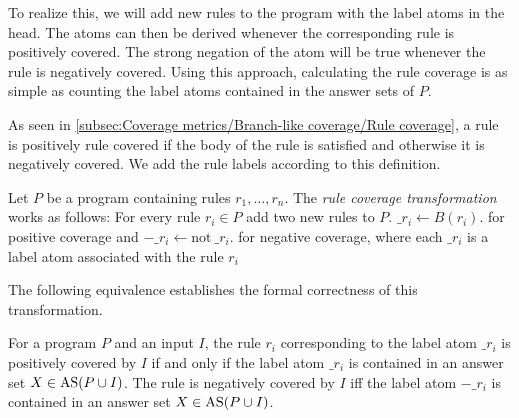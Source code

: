 To realize this, we will add new rules to the program with the label atoms in the head. The atoms can then be derived whenever the corresponding rule is positively covered. The strong negation of the atom will be true whenever the rule is negatively covered. Using this approach, calculating the rule coverage is as simple as counting the label atoms contained in the answer sets of $P$.

As seen in \cref{subsec:Coverage metrics/Branch-like coverage/Rule coverage}, a rule is positively rule covered if the body of the rule is satisfied and otherwise it is negatively covered. We add the rule labels according to this definition.

\begin{definition}
\label{def:rule transformation}
    Let $P$ be a program containing rules \(r_1, \ldots, r_n\). The \emph{rule coverage transformation} works as follows: For every rule \(r_i \in P\) add two new rules to $P$. \(\_r_i \leftarrow B(r_i).\) for positive coverage and \(-\_r_i \leftarrow \text{not}\ \_r_i.\) for negative coverage, where each $\_r_i$ is a label atom associated with the rule $r_i$
\end{definition}

The following equivalence establishes the formal correctness of this transformation.
\begin{theorem}
\label{th:rule transformation}
    For a program $P$ and an input $I$, the rule $r_i$ corresponding to the label atom $\_r_i$ is positively covered by $I$ if and only if the label atom $\_r_i$ is contained in an answer set \(X \in \operatorname{AS}(P \cup I)\). The rule is negatively covered by $I$ iff the label atom $-\_r_i$ is contained in an answer set \(X \in \operatorname{AS}(P \cup I)\).

\end{theorem}

